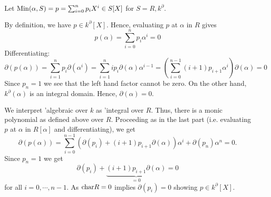 \bws Let $\mathrm{Min}(\alpha,S) = p = \sum_{i=0}^n p_i X^i \in S[X]$ for $S = R, k^\partial$.
\bn
\item By definition, we have $p \in k^\partial[X]$. Hence, evaluating $p$ at $\alpha$ in $R$ gives
$$p(\alpha) = \sum_{i=0}^n p_i \alpha^i = 0$$
Differentiating:
$$\partial(p(\alpha)) = \sum_{i=1}^n p_i \partial(\alpha^i) = \sum_{i=1}^n i p_i \partial(\alpha) \alpha^{i-1} = \left(\sum_{i=0}^{n-1} (i + 1) p_{i+1} \alpha^i\right) \partial(\alpha) = 0$$
Since $p_n = 1$ we see that the left hand factor cannot be zero. On the other hand, $k^\partial(\alpha)$ is an integral domain. Hence, $\partial(\alpha) = 0$.
\item We interpret 'algebraic over $k$ as 'integral over $R$. Thus, there is a monic polynomial as defined above over $R$. Proceeding as in the last part (i.e. evaluating $p$ at $\alpha$ in $R[\alpha]$ and differentiating), we get
$$\partial(p(\alpha)) = \sum_{i=0}^{n-1} \left(\partial(p_{i}) + (i + 1) p_{i+1} \partial(\alpha)\right) \alpha^i + \partial(p_n) \alpha^n = 0.$$
Since $p_n = 1$ we get
$$\partial(p_i) + \underbrace{(i + 1) p_{i+1} \partial(\alpha)}_{=0} = 0$$
for all $i = 0,\cdots,n - 1$. As $\mathrm{char} R = 0$ implies $\partial(p_i) = 0$ showing $p \in k^\partial[X]$.
\en

